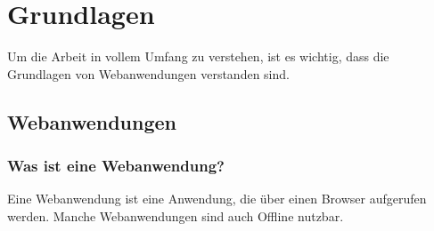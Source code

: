 
\section{Grundlagen}\label{sec:grundlagen}
Um die Arbeit in vollem Umfang zu verstehen, ist es wichtig, dass die Grundlagen von Webanwendungen verstanden sind.
\subsection{Webanwendungen}\label{subsec:webanwendungen}

\subsubsection{Was ist eine Webanwendung?}
Eine Webanwendung ist eine Anwendung, die über einen Browser aufgerufen werden.
Manche Webanwendungen sind auch Offline nutzbar.
